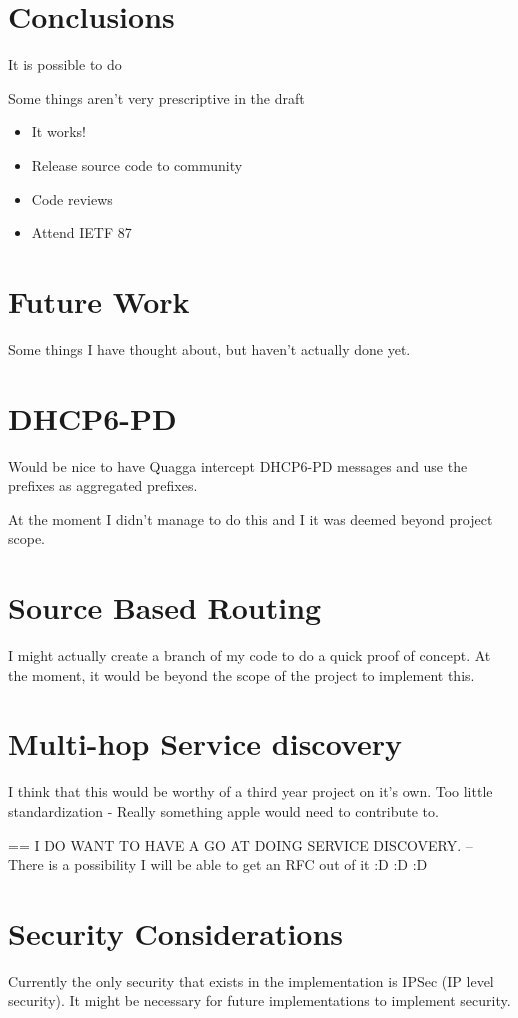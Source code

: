 \documentclass[12pt]{report}
\begin{document}
\section{Conclusions}

It is possible to do

Some things aren't very prescriptive in the draft

\begin{itemize}
\item It works! 
\item Release source code to community
\item Code reviews
\item Attend IETF 87
\end{itemize}

\section{Future Work}
Some things I have thought about, but haven't actually done yet.

\section{DHCP6-PD}
Would be nice to have Quagga intercept DHCP6-PD messages and use the prefixes
as aggregated prefixes. 

At the moment I didn't manage to do this and I it was deemed beyond project
scope.

\section{Source Based Routing}
I might actually create a branch of my code to do a quick proof of concept. At
the moment, it would be beyond the scope of the project to implement this. 

\section{Multi-hop Service discovery}
I think that this would be worthy of a third year project on it's own.  Too
little standardization - Really something apple would need to contribute to. 

== I DO WANT TO HAVE A GO AT DOING SERVICE DISCOVERY.
-- There is a possibility I will be able to get an RFC out of it :D :D :D

\section{Security Considerations}
Currently the only security that exists in the implementation is IPSec (IP
level security). It might be necessary for future implementations to implement
security.
\end{document}
